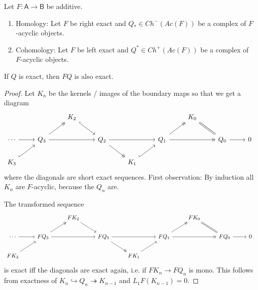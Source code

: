 \documentclass[fontsize=11pt,fleqn,a4paper]{scrartcl}
\begin{document}
\begin{lemma}
Let $F:\mathsf{A}\to\mathsf{B}$ be additive.
\begin{multicols}{2}
\begin{enumerate}
\item Homology: Let $F$ be right exact and $Q_\ast\in Ch^-(Ac(F))$ be a complex of $F$-acyclic objects.
\item Cohomology: Let $F$ be left exact and $Q^\ast\in Ch^+(Ac(F))$ be a complex of $F$-acyclic objects.
\end{enumerate}
\end{multicols}
If $Q$ is exact, then $FQ$ is also exact.
\end{lemma}
\begin{proof}
Let $K_n$ be the kernels / images of the boundary maps so that we get a diagram
\[\begin{tikzcd}
&& K_2 \ar[rd,hook] && && K_0 \ar[rd,equal] && \\
\cdots \ar[r] & Q_3 \ar[ru,->>] \ar[rr] && Q_2 \ar[dr,->>] \ar[rr] && Q_1 \ar[rr,->>] \ar[ru,->>]  && Q_0 \ar[r] & 0 \\
K_3 \ar[ru,hook] && && K_1 \ar[ru,hook] && &&
\end{tikzcd}\]
where the diagonals are short exact sequences. First observation: By induction all $K_n$ are $F$-acyclic, because the $Q_n$ are.

The transformed sequence
\[\begin{tikzcd}
&& FK_2 \ar[rd] && && FK_0 \ar[rd,equal] && \\
\cdots \ar[r] & FQ_3 \ar[ru,->>] \ar[rr] && FQ_2 \ar[dr,->>] \ar[rr] && FQ_1 \ar[rr,->>] \ar[ru,->>] && FQ_0 \ar[r] & 0 \\
FK_3 \ar[ru] && && FK_1 \ar[ru] && &&
\end{tikzcd}\]
is exact iff the diagonals are exact again, i.e. if $FK_n \to FQ_n$ is mono. This follows from exactness of $K_n \hookrightarrow Q_n \twoheadrightarrow K_{n-1}$ and $L_1F(K_{n-1})=0$.
\end{proof}
\end{document}
